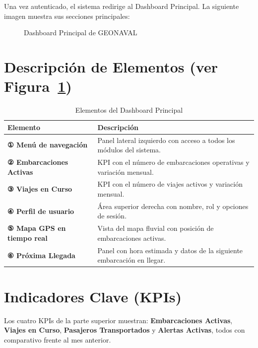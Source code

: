 \documentclass[12pt,a4paper]{report}
\begin{document}
Una vez autenticado, el sistema redirige al Dashboard Principal. La siguiente imagen muestra sus secciones principales:

\begin{figure}[H]
  \centering
  \fbox{\rule{0pt}{4cm}\hspace{10cm}}
  \caption{Dashboard Principal de GEONAVAL}
  \label{fig:dashboard}
\end{figure}

\section{Descripción de Elementos (ver Figura~\ref{fig:dashboard})}

\begin{table}[H]
  \centering
  \renewcommand{\arraystretch}{1.4}
  \begin{tabularx}{\textwidth}{@{}L{4.5cm} X@{}}
    \toprule
    \textbf{Elemento} & \textbf{Descripción} \\
    \midrule
    \textbf{① Menú de navegación} & Panel lateral izquierdo con acceso a todos los módulos del sistema. \\
    \textbf{② Embarcaciones Activas} & KPI con el número de embarcaciones operativas y variación mensual. \\
    \textbf{③ Viajes en Curso} & KPI con el número de viajes activos y variación mensual. \\
    \textbf{④ Perfil de usuario} & Área superior derecha con nombre, rol y opciones de sesión. \\
    \textbf{⑤ Mapa GPS en tiempo real} & Vista del mapa fluvial con posición de embarcaciones activas. \\
    \textbf{⑥ Próxima Llegada} & Panel con hora estimada y datos de la siguiente embarcación en llegar. \\
    \bottomrule
  \end{tabularx}
  \caption{Elementos del Dashboard Principal}
\end{table}

\section{Indicadores Clave (KPIs)}

Los cuatro KPIs de la parte superior muestran: \textbf{Embarcaciones Activas}, \textbf{Viajes en Curso}, \textbf{Pasajeros Transportados} y \textbf{Alertas Activas}, todos con comparativo frente al mes anterior.
\end{document}

